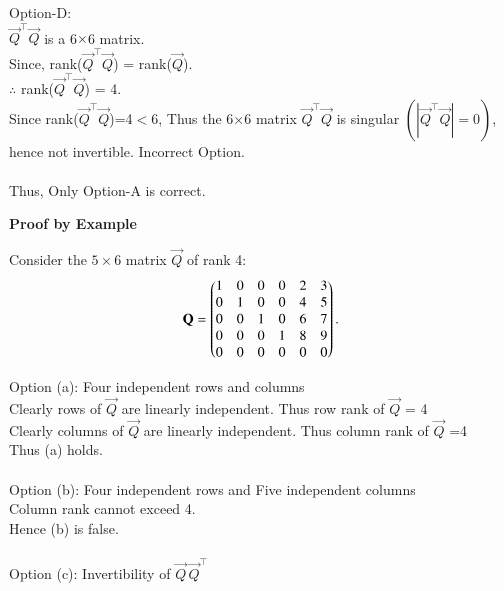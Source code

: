 \documentclass[journal]{IEEEtran}
\begin{document}
Option-D:\\
$\vec{Q}^\top\vec{Q}$ is a 6$\times$6 matrix.\\
Since, rank($\vec{Q}^\top\vec{Q}$) = rank($\vec{Q}$).\\
$\therefore$ rank($\vec{Q}^\top\vec{Q}$) = 4.\\
Since rank($\vec{Q}^\top\vec{Q}$)=4$<$6, Thus the 6$\times$6 matrix $\vec{Q}^\top\vec{Q}$ is singular $\left(|\vec{Q}^\top\vec{Q}|=0\right)$, hence not invertible.
\bigskip
Incorrect Option.\\\\

Thus, Only Option-A is correct.








\newpage
\textbf{Proof by Example}

Consider the $5\times6$ matrix $\vec{Q}$ of rank 4:
\begin{equation}
\mathbf{Q}
=
\begin{pmatrix}
1 & 0 & 0 & 0 & 2 & 3\\
0 & 1 & 0 & 0 & 4 & 5\\
0 & 0 & 1 & 0 & 6 & 7\\
0 & 0 & 0 & 1 & 8 & 9\\
0 & 0 & 0 & 0 & 0 & 0
\end{pmatrix}.
\end{equation}

Option (a): Four independent rows and columns\\

Clearly rows of $\vec{Q}$ are linearly independent. Thus row rank of $\vec{Q}$ = 4\\
Clearly columns of $\vec{Q}$ are linearly independent. Thus column rank of $\vec{Q}$ =4\\
Thus (a) holds.\\\\

Option (b): Four independent rows and Five independent columns\\

Column rank cannot exceed 4.\\
Hence (b) is false.\\\\

Option (c): Invertibility of $\vec{Q}\,\vec{Q}^\top$\\
\end{document}
